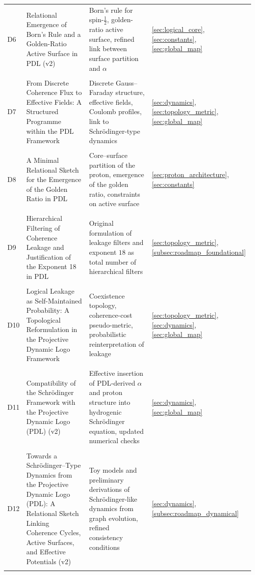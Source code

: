 \documentclass[11pt,a4paper]{article}
\begin{document}
\begin{longtable}{@{}p{0.9cm}L{5cm}L{6.5cm}L{2.4cm}@{}}
  D6 &
  Relational Emergence of Born's Rule and a Golden-Ratio Active Surface in PDL (v2) &
  Born's rule for spin-$\tfrac{1}{2}$, golden-ratio active surface, refined link between surface partition and $\alpha$ &
  \ref{sec:logical_core}, \ref{sec:constants}, \ref{sec:global_map} \\\\[0.4em]

  D7 &
  From Discrete Coherence Flux to Effective Fields: A Structured Programme within the PDL Framework &
  Discrete Gauss–Faraday structure, effective fields, Coulomb profiles, link to Schr\"odinger-type dynamics &
  \ref{sec:dynamics}, \ref{sec:topology_metric}, \ref{sec:global_map} \\\\[0.4em]

  D8 &
  A Minimal Relational Sketch for the Emergence of the Golden Ratio in PDL &
  Core–surface partition of the proton, emergence of the golden ratio, constraints on active surface &
  \ref{sec:proton_architecture}, \ref{sec:constants} \\\\[0.4em]

  D9 &
  Hierarchical Filtering of Coherence Leakage and Justification of the Exponent 18 in PDL &
  Original formulation of leakage filters and exponent $18$ as total number of hierarchical filters &
  \ref{sec:topology_metric}, \ref{subsec:roadmap_foundational} \\\\[0.4em]

  D10 &
  Logical Leakage as Self-Maintained Probability: A Topological Reformulation in the Projective Dynamic Logo Framework &
  Coexistence topology, coherence-cost pseudo-metric, probabilistic reinterpretation of leakage &
  \ref{sec:topology_metric}, \ref{sec:dynamics}, \ref{sec:global_map} \\\\[0.4em]

  D11 &
  Compatibility of the Schr\"odinger Framework with the Projective Dynamic Logo (PDL) (v2) &
  Effective insertion of PDL-derived $\alpha$ and proton structure into hydrogenic Schr\"odinger equation, updated numerical checks &
  \ref{sec:dynamics}, \ref{sec:global_map} \\\\[0.4em]

  D12 &
  Towards a Schr\"odinger--Type Dynamics from the Projective Dynamic Logo (PDL): A Relational Sketch Linking Coherence Cycles, Active Surfaces, and Effective Potentials (v2) &
  Toy models and preliminary derivations of Schr\"odinger-like dynamics from graph evolution, refined consistency conditions &
  \ref{sec:dynamics}, \ref{subsec:roadmap_dynamical} \\\\[0.4em]


\end{longtable}
\end{document}
